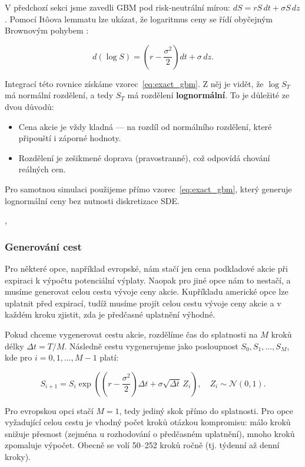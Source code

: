 \documentclass{article}
\begin{document}
V předchozí sekci jsme zavedli GBM pod risk-neutrální mírou: $dS = r S\,dt + \sigma S\,dz$. Pomocí Itôova lemmatu lze ukázat, že logaritmus ceny se řídí obyčejným Brownovým pohybem \citep{Wilmott2006}:

\begin{equation}
  d(\log S) = (r - \frac{\sigma^2}{2}) dt + \sigma \, dz.
\end{equation}

Integrací této rovnice získáme vzorec~\eqref{eq:exact_gbm}. Z něj je vidět, že $\log S_T$ má normální rozdělení, a tedy $S_T$ má rozdělení \textbf{lognormální}. To je důležité ze dvou důvodů:

\begin{itemize}
  \item Cena akcie je vždy kladná — na rozdíl od normálního rozdělení, které připouští i záporné hodnoty.
  \item Rozdělení je zešikmené doprava (pravostranné), což odpovídá chování reálných cen.
\end{itemize}

Pro samotnou simulaci použijeme přímo vzorec~\eqref{eq:exact_gbm}, který generuje lognormální ceny bez nutnosti diskretizace SDE.

\citep[Kapitola~24.3]{McDonald2013}, \citep[Kapitola~80.3]{Wilmott2006}

\subsubsection{Generování cest}

Pro některé opce, například evropské, nám stačí jen cena podkladové akcie při expiraci k výpočtu potenciální výplaty. Naopak pro jiné opce nám to nestačí, a musíme generovat celou cestu vývoje ceny akcie. Kupříkladu americké opce lze uplatnit před expirací, tudíž musíme projít celou cestu vývoje ceny akcie a v každém kroku zjistit, zda je předčasné uplatnění výhodné.

Pokud chceme vygenerovat cestu akcie, rozdělíme čas do splatnosti na $M$ kroků délky $\Delta t = T/M$. Následně cestu vygenerujeme jako posloupnost $S_0, S_1, \dots, S_M$, kde pro $i = 0, 1, \dots, M-1$ platí:

\begin{equation}
  S_{i+1} = S_i \exp\!\left( (r - \frac{\sigma^2}{2}) \Delta t + \sigma \sqrt{\Delta t} \, Z_i \right), \quad Z_i \sim \mathcal{N}(0,1).
\end{equation}

Pro evropskou opci stačí $M = 1$, tedy jediný skok přímo do splatnosti. Pro opce vyžadující celou cestu je vhodný počet kroků otázkou kompromisu: málo kroků snižuje přesnost (zejména u rozhodování o předčasném uplatnění), mnoho kroků zpomaluje výpočet. Obecně se volí 50--252 kroků ročně (tj. týdenní až denní kroky).
\end{document}
